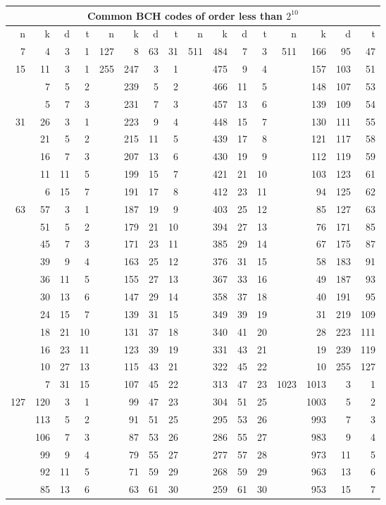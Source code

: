 \begin{table}[!ht]
\small
\begin{center}
\begin{tabular}{rrrr|rrrr|rrrr|rrrr}
\toprule
\multicolumn{16}{c}{\textbf{Common BCH codes of order less than $2^{10}$}}\\
\midrule
\hline
n & k & d & t & n & k & d & t & n & k & d & t & n & k & d & t \\
\hline
7&4&3&1&127&8&63&31&511&484&7&3&511&166&95&47\\
15&11&3&1&255&247&3&1&&475&9&4&&157&103&51\\
&7&5&2&&239&5&2&&466&11&5&&148&107&53\\
&5&7&3&&231&7&3&&457&13&6&&139&109&54\\
31&26&3&1&&223&9&4&&448&15&7&&130&111&55\\
&21&5&2&&215&11&5&&439&17&8&&121&117&58\\
&16&7&3&&207&13&6&&430&19&9&&112&119&59\\
&11&11&5&&199&15&7&&421&21&10&&103&123&61\\
&6&15&7&&191&17&8&&412&23&11&&94&125&62\\
63&57&3&1&&187&19&9&&403&25&12&&85&127&63\\
&51&5&2&&179&21&10&&394&27&13&&76&171&85\\
&45&7&3&&171&23&11&&385&29&14&&67&175&87\\
&39&9&4&&163&25&12&&376&31&15&&58&183&91\\
&36&11&5&&155&27&13&&367&33&16&&49&187&93\\
&30&13&6&&147&29&14&&358&37&18&&40&191&95\\
&24&15&7&&139&31&15&&349&39&19&&31&219&109\\
&18&21&10&&131&37&18&&340&41&20&&28&223&111\\
&16&23&11&&123&39&19&&331&43&21&&19&239&119\\
&10&27&13&&115&43&21&&322&45&22&&10&255&127\\
&7&31&15&&107&45&22&&313&47&23&1023&1013&3&1\\
127&120&3&1&&99&47&23&&304&51&25&&1003&5&2\\
&113&5&2&&91&51&25&&295&53&26&&993&7&3\\
&106&7&3&&87&53&26&&286&55&27&&983&9&4\\
&99&9&4&&79&55&27&&277&57&28&&973&11&5\\
&92&11&5&&71&59&29&&268&59&29&&963&13&6\\
&85&13&6&&63&61&30&&259&61&30&&953&15&7\\

\end{tabular}
\end{center}
\end{table}
